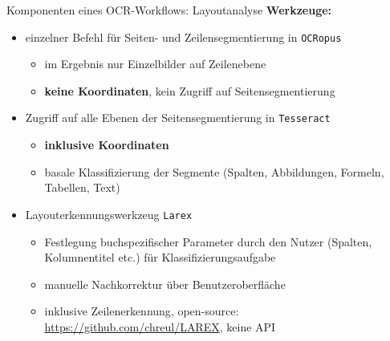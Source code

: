 \documentclass{bbawslides}
\begin{document}
\begin{bbawslide}{Komponenten eines OCR-Workflows: Layoutanalyse}
  \vspace*{2mm}%
  \centerslidestrue%
  \textbf{Werkzeuge:}
  \begin{itemize}
    \item einzelner Befehl für Seiten- und Zeilensegmentierung in \texttt{OCRopus} 
    \begin{itemize}\small
      \item im Ergebnis nur Einzelbilder auf Zeilenebene
      \item \textbf{keine Koordinaten}, kein Zugriff auf Seitensegmentierung
    \end{itemize}
    \item Zugriff auf alle Ebenen der Seitensegmentierung in \texttt{Tesseract}
    \begin{itemize}\small
      \item \textbf{inklusive Koordinaten}
      \item basale Klassifizierung der Segmente (Spalten, Abbildungen, Formeln, Tabellen, Text)
    \end{itemize}
    \item Layouterkennungswerkzeug \texttt{Larex} 
    \begin{itemize}\small
      \item Festlegung buchspezifischer Parameter durch den Nutzer (Spalten, Kolumnentitel etc.) für Klassifizierungsaufgabe
      \item manuelle Nachkorrektur über Benutzeroberfläche
      \item inklusive Zeilenerkennung, open-source: \url{https://github.com/chreul/LAREX}, keine API
    \end{itemize}
  \end{itemize}
\end{bbawslide}
\end{document}
